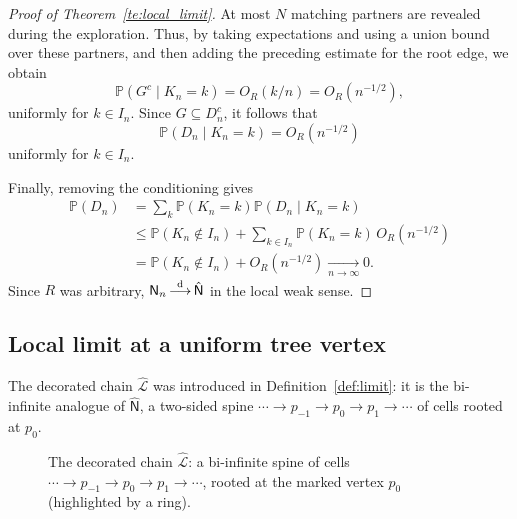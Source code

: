 \documentclass[english,11pt]{smfart}
\newcommand{\Prb}[1]{\mathbb{P}\left(#1\right)}
\newcommand{\convdis}{\,{\buildrel \mathrm{d} \over \longrightarrow}\,}
\newcommand{\cL}{\mathcal{L}}
\newcommand{\mN}{\mathsf{N}}
\numberwithin{equation}{section}
\begin{document}
\begin{proof}[Proof of Theorem~\ref{te:local_limit}]
\smallskip
At most \(N\) matching partners are revealed during the exploration. Thus,
by taking expectations and using a union bound over these partners, and then
adding the preceding estimate for the root edge, we obtain
\[
  \Prb{G^c\mid K_n=k}
  =
  O_R(k/n)
  =
  O_R(n^{-1/2}),
\]
uniformly for \(k\in I_n\). Since \(G\subseteq D_n^c\), it follows that
\[
  \Prb{D_n\mid K_n=k}=O_R(n^{-1/2})
\]
uniformly for \(k\in I_n\).

\smallskip
Finally, removing the conditioning gives
\begin{align*}
  \Prb{D_n}
  &=
  \sum_k \Prb{K_n=k}\Prb{D_n\mid K_n=k} \\
  &\le
  \Prb{K_n\notin I_n}
  +
  \sum_{k\in I_n}\Prb{K_n=k}\,O_R(n^{-1/2}) \\
  &=
  \Prb{K_n\notin I_n}
  +
  O_R(n^{-1/2})
  \xrightarrow[n\to\infty]{}0.
\end{align*}
Since \(R\) was arbitrary, \(\mN_n\convdis\hat{\mN}\) in the local weak sense.
\end{proof}
\subsection{Local limit at a uniform tree vertex}
\label{ssec:unary}

The decorated chain $\hat{\cL}$ was introduced in Definition~\ref{def:limit}:
it is the bi-infinite analogue of $\hat{\mN}$, a two-sided spine
$\cdots\to p_{-1}\to p_0\to p_1\to\cdots$ of cells rooted at $p_0$.

\begin{figure}[!htbp]
\centering
{}
\caption{The decorated chain $\hat{\cL}$: a bi-infinite spine of cells
$\cdots\to p_{-1}\to p_0\to p_1\to\cdots$, rooted at the marked vertex
$p_0$ (highlighted by a ring).}
\label{fig:Lhat}
\end{figure}
\end{document}

